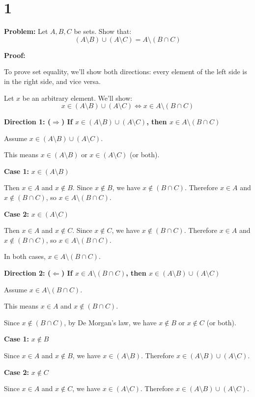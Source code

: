 \documentclass[12pt,a4paper]{article}
\theoremstyle{definition}
\theoremstyle{remark}
\begin{document}
\section*{1}

\textbf{Problem:} Let $A, B, C$ be sets. Show that:
$$(A \setminus B) \cup (A \setminus C) = A \setminus (B \cap C)$$

\textbf{Proof:}

To prove set equality, we'll show both directions: every element of the left side is in the right side, and vice versa.

Let $x$ be an arbitrary element. We'll show:
$$x \in (A \setminus B) \cup (A \setminus C) \iff x \in A \setminus (B \cap C)$$

\textbf{Direction 1: ($\Rightarrow$) If $x \in (A \setminus B) \cup (A \setminus C)$, then $x \in A \setminus (B \cap C)$}

Assume $x \in (A \setminus B) \cup (A \setminus C)$.

This means $x \in (A \setminus B)$ or $x \in (A \setminus C)$ (or both).

\textbf{Case 1:} $x \in (A \setminus B)$

Then $x \in A$ and $x \notin B$.
Since $x \notin B$, we have $x \notin (B \cap C)$.
Therefore $x \in A$ and $x \notin (B \cap C)$, so $x \in A \setminus (B \cap C)$.

\textbf{Case 2:} $x \in (A \setminus C)$

Then $x \in A$ and $x \notin C$.
Since $x \notin C$, we have $x \notin (B \cap C)$.
Therefore $x \in A$ and $x \notin (B \cap C)$, so $x \in A \setminus (B \cap C)$.

In both cases, $x \in A \setminus (B \cap C)$.

\textbf{Direction 2: ($\Leftarrow$) If $x \in A \setminus (B \cap C)$, then $x \in (A \setminus B) \cup (A \setminus C)$}

Assume $x \in A \setminus (B \cap C)$.

This means $x \in A$ and $x \notin (B \cap C)$.

Since $x \notin (B \cap C)$, by De Morgan's law, we have $x \notin B$ or $x \notin C$ (or both).

\textbf{Case 1:} $x \notin B$

Since $x \in A$ and $x \notin B$, we have $x \in (A \setminus B)$.
Therefore $x \in (A \setminus B) \cup (A \setminus C)$.

\textbf{Case 2:} $x \notin C$

Since $x \in A$ and $x \notin C$, we have $x \in (A \setminus C)$.
Therefore $x \in (A \setminus B) \cup (A \setminus C)$.
\end{document}

